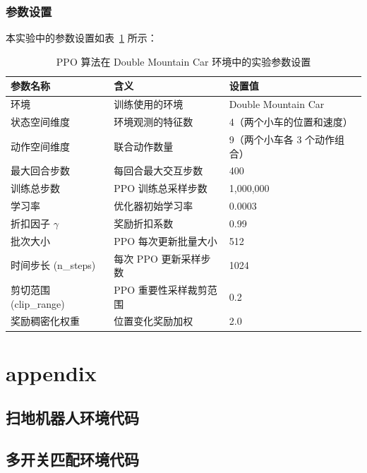 \documentclass[citestyle=gb7714-2015, bibstyle=gb7714-2015,lang=cn,14pt,scheme=chinese]{elegantbook}
\begin{document}
\subsection{参数设置}

本实验中的参数设置如表~\ref{tab:ppo-double-mountain-car-params} 所示：

\begin{table}[htbp]
\centering
\caption{PPO 算法在 Double Mountain Car 环境中的实验参数设置}
\label{tab:ppo-double-mountain-car-params}
\begin{tabular}{@{}lll@{}}
\toprule
\textbf{参数名称} & \textbf{含义} & \textbf{设置值} \\
\midrule
环境    & 训练使用的环境 & Double Mountain Car \\
状态空间维度    & 环境观测的特征数 & 4（两个小车的位置和速度） \\
动作空间维度    & 联合动作数量     & 9（两个小车各 3 个动作组合） \\
最大回合步数    & 每回合最大交互步数 & 400 \\
训练总步数  & PPO 训练总采样步数 & 1,000,000 \\
学习率  & 优化器初始学习率  & 0.0003 \\
折扣因子 \(\gamma\) & 奖励折扣系数      & 0.99 \\
批次大小    & PPO 每次更新批量大小 & 512 \\
时间步长 (n\_steps) & 每次 PPO 更新采样步数 & 1024 \\
剪切范围 (clip\_range)  & PPO 重要性采样裁剪范围 & 0.2 \\
奖励稠密化权重  & 位置变化奖励加权  & 2.0 \\
\bottomrule
\end{tabular}
\end{table}

\nocite{*}

\printbibliography[heading=bibintoc, title=\ebibname]
\appendix

\chapter{appendix}

\section{扫地机器人环境代码}\label{sec:sweeping-robot-env}



\section{多开关匹配环境代码}\label{sec:multi-switch-env}
\end{document}
